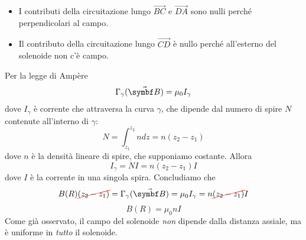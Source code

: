 \begin{examplewt}
	\begin{itemize}
		\item I contributi della circuitazione lungo  $\overrightarrow{BC}$ e $\overrightarrow{DA}$ sono nulli perché perpendicolari al campo.
		\item Il contributo della circuitazione lungo $\overrightarrow{CD}$ è nullo perché all'esterno del solenoide non c'è campo.
	\end{itemize}
	Per la legge di Ampère
	\begin{equation*}
		\Gamma_{\gamma}(\vba{B})=\mu_0I_\gamma
	\end{equation*}
	dove $I_\gamma$ è corrente che attraversa la curva $\gamma$, che dipende dal numero di spire $N$ contenute all'interno di $\gamma$:
	\begin{equation*}
		N=\int_{z_1}^{z_2}ndz=n\left(z_2-z_1\right)
	\end{equation*}
	dove $n$ è la densità lineare di spire, che supponiamo costante. Allora
	\begin{equation*}
		I_{\gamma}=N I = n\left(z_2-z_1\right) I
	\end{equation*}
	dove $I$ è la corrente in una singola spira. Concludiamo che
	\begin{equation*}
		B(R)\Ccancel[red]{(z_2-z_1)}=\Gamma_{\gamma}(\vba{B})=\mu_0I_\gamma=n\Ccancel[red]{(z_2-z_1)} I
	\end{equation*}
	\begin{equation*}
		B(R)=\mu_0 n I
	\end{equation*}
	Come già osservato, il campo del solenoide \textit{non} dipende dalla distanza assiale, ma è uniforme in \textit{tutto} il solenoide. 
\end{examplewt}
